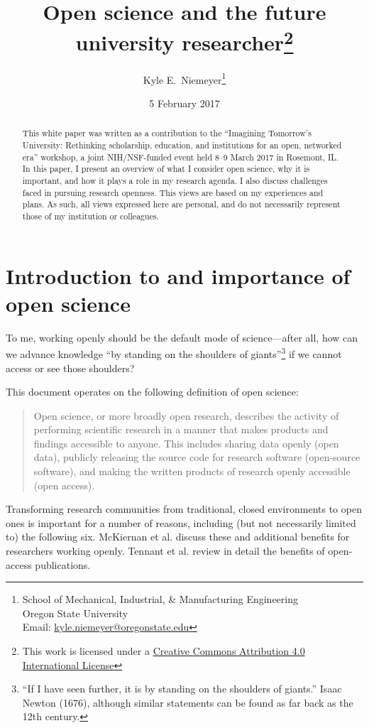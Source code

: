\documentclass[nobib]{tufte-handout}
\title{Open science and the future university researcher\thanks{This
work is licensed under a
\href{https://creativecommons.org/licenses/by/4.0/}{Creative Commons Attribution
4.0 International License} \ccby}}
\author[Kyle E.~Niemeyer]{Kyle E.~Niemeyer\thanks{
School of Mechanical, Industrial, \& Manufacturing Engineering\\
\noindent Oregon State University\\
\noindent Email: \href{mailto:kyle.niemeyer@oregonstate.edu}{kyle.niemeyer@oregonstate.edu}
}}
\date{5 February 2017} %
\begin{document}
\maketitle%

\begin{abstract}
\noindent
This white paper was written as a contribution to the ``Imagining Tomorrow's University:
Rethinking scholarship, education, and institutions for an open, networked era''
workshop, a joint NIH\slash NSF-funded event held 8--9 March 2017 in Rosemont, IL.
In this paper, I present an overview of what I consider open science,
why it is important, and how it plays a role in my research agenda.
I also discuss challenges faced in pursuing research openness.
This views are based on my experiences and plans. As such, all views expressed
here are personal, and do not necessarily represent those
of my institution or colleagues.
\end{abstract}

\section{Introduction to and importance of open science}
\label{sec:intro}

To me, working openly should be the default mode of science---after all, how can
we advance knowledge ``by standing on the shoulders of giants''\footnote{``If I
have seen further, it is by standing on the shoulders of giants.'' Isaac
Newton (1676), although similar statements can be found as far back as the 12th
century.} if we cannot access or see those shoulders?

This document operates on the following definition of open science:
\begin{quote}
Open science, or more broadly open research, describes the activity of performing
scientific research in a manner that makes products and findings accessible to
anyone. This includes sharing data openly (open data), publicly releasing the
source code for research software (open-source software), and making the written
products of research openly accessible (open access).
\end{quote}

Transforming research communities from traditional, closed environments to open
ones is important for a number of reasons, including (but not necessarily limited
to) the following six. McKiernan et al.\autocite{McKiernan:2016iz} discuss these
and additional benefits for researchers working openly. Tennant et al.\autocite{Tennant:2016bi}
review in detail the benefits of open-access publications.
\end{document}
